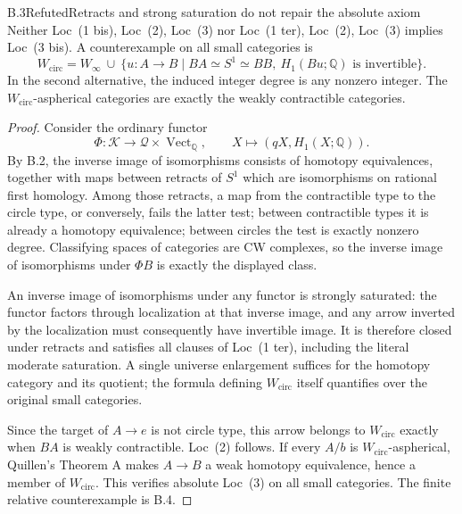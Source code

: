 \begin{claim}{B.3}{Refuted}{Retracts and strong saturation do not repair the absolute axiom}
Neither Loc~(1 bis), Loc~(2), Loc~(3) nor Loc~(1 ter), Loc~(2), Loc~(3)
implies Loc~(3 bis). A counterexample on all small categories is
\[
 W_{\mathrm{circ}}=W_\infty\ \cup\
 \{u:A\to B\mid BA\simeq S^1\simeq BB,
          \ H_1(Bu;\mathbb Q)\text{ is invertible}\}.
\]
In the second alternative, the induced integer degree is any nonzero
integer. The $W_{\mathrm{circ}}$-aspherical categories are exactly the
weakly contractible categories.
\end{claim}
\begin{proof}
Consider the ordinary functor
\[
 \Phi:\mathscr K\longrightarrow\mathscr Q\times\operatorname{Vect}_{\mathbb Q},
 \qquad X\longmapsto(qX,H_1(X;\mathbb Q)).
\]
By B.2, the inverse image of isomorphisms consists of homotopy
equivalences, together with maps between retracts of $S^1$ which are
isomorphisms on rational first homology. Among those retracts, a map from
the contractible type to the circle type, or conversely, fails the latter
test; between contractible types it is already a homotopy equivalence;
between circles the test is exactly nonzero degree. Classifying spaces of
categories are CW complexes, so the inverse image of isomorphisms under
$\Phi B$ is exactly the displayed class.

An inverse image of isomorphisms under any functor is strongly saturated:
the functor factors through localization at that inverse image, and any
arrow inverted by the localization must consequently have invertible
image. It is therefore closed under retracts and satisfies all clauses of
Loc~(1 ter), including the literal moderate saturation. A single
universe enlargement suffices for the homotopy category and its quotient;
the formula defining $W_{\mathrm{circ}}$ itself quantifies over the
original small categories.

Since the target of $A\to e$ is not circle type, this arrow belongs to
$W_{\mathrm{circ}}$ exactly when $BA$ is weakly contractible. Loc~(2)
follows. If every $A/b$ is $W_{\mathrm{circ}}$-aspherical, Quillen's
Theorem A makes $A\to B$ a weak homotopy equivalence, hence a member of
$W_{\mathrm{circ}}$. This verifies absolute Loc~(3) on all small
categories. The finite relative counterexample is B.4.
\end{proof}

